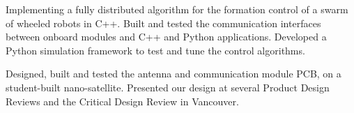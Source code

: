 \documentclass{ResumeTemplate}
\begin{document}

    \workitemsthree
    {Implementing a fully distributed algorithm for the formation control of a swarm of wheeled robots in C++.}
    {Built and tested the communication interfaces between onboard modules and C++ and Python applications.}
    {Developed a Python simulation framework to test and tune the control algorithms. }
    

    \workitemstwo
    {Designed, built and tested the antenna and communication module PCB, on a student-built nano-satellite.}
    {Presented our design at several Product Design Reviews and the Critical Design Review in Vancouver.}
\end{document}
